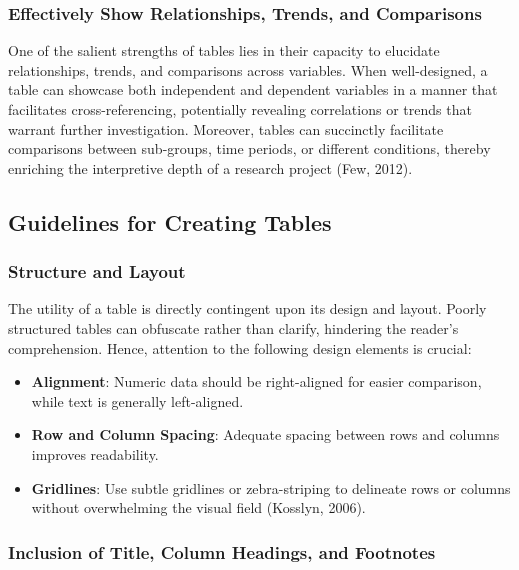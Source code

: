 \documentclass[
  b5paper]{book}
\providecommand{\tightlist}{%
  \setlength{\itemsep}{0pt}\setlength{\parskip}{0pt}}
\begin{document}
\hypertarget{effectively-show-relationships-trends-and-comparisons-1}{%
\subsubsection{Effectively Show Relationships, Trends, and Comparisons}\label{effectively-show-relationships-trends-and-comparisons-1}}

One of the salient strengths of tables lies in their capacity to elucidate relationships, trends, and comparisons across variables. When well-designed, a table can showcase both independent and dependent variables in a manner that facilitates cross-referencing, potentially revealing correlations or trends that warrant further investigation. Moreover, tables can succinctly facilitate comparisons between sub-groups, time periods, or different conditions, thereby enriching the interpretive depth of a research project (Few, 2012).

\hypertarget{guidelines-for-creating-tables-1}{%
\subsection{Guidelines for Creating Tables}\label{guidelines-for-creating-tables-1}}

\hypertarget{structure-and-layout-1}{%
\subsubsection{Structure and Layout}\label{structure-and-layout-1}}

The utility of a table is directly contingent upon its design and layout. Poorly structured tables can obfuscate rather than clarify, hindering the reader's comprehension. Hence, attention to the following design elements is crucial:

\begin{itemize}
\tightlist
\item
  \textbf{Alignment}: Numeric data should be right-aligned for easier comparison, while text is generally left-aligned.
\item
  \textbf{Row and Column Spacing}: Adequate spacing between rows and columns improves readability.
\item
  \textbf{Gridlines}: Use subtle gridlines or zebra-striping to delineate rows or columns without overwhelming the visual field (Kosslyn, 2006).
\end{itemize}

\hypertarget{inclusion-of-title-column-headings-and-footnotes-1}{%
\subsubsection{Inclusion of Title, Column Headings, and Footnotes}\label{inclusion-of-title-column-headings-and-footnotes-1}}
\end{document}
